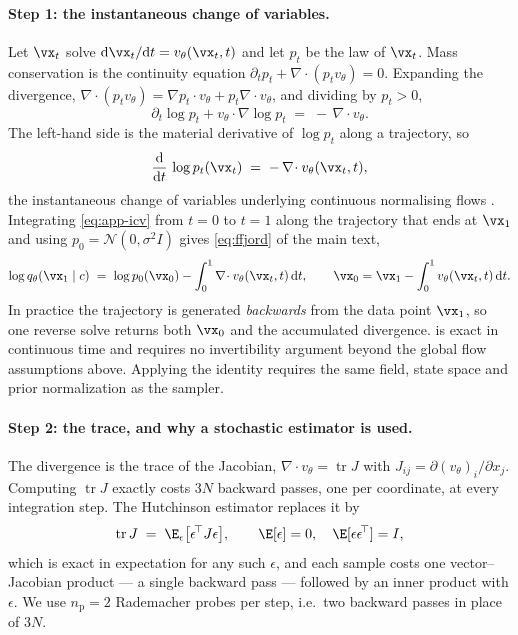 \paragraph{Step 1: the instantaneous change of variables.} Let $\vx_t$ solve
$\mathrm{d}\vx_t/\mathrm{d}t = v_\theta(\vx_t,t)$ and let $p_t$ be the law of
$\vx_t$. Mass conservation is the continuity equation
$\partial_t p_t + \nabla\!\cdot(p_t v_\theta) = 0$. Expanding the divergence,
$\nabla\!\cdot(p_t v_\theta) = \nabla p_t \cdot v_\theta + p_t \nabla\!\cdot v_\theta$,
and dividing by $p_t > 0$,
\begin{equation}
  \partial_t \log p_t + v_\theta \cdot \nabla \log p_t
  \;=\; -\,\nabla\!\cdot v_\theta .
\end{equation}
The left-hand side is the material derivative of $\log p_t$ along a trajectory, so
\begin{equation}
  \frac{\mathrm{d}}{\mathrm{d}t}\,\log p_t(\vx_t)
  \;=\; -\,\nabla\!\cdot v_\theta(\vx_t,t) ,
  \label{eq:app-icv}
\end{equation}
the instantaneous change of variables underlying continuous normalising flows
\citep{ffjord}. Integrating \eqref{eq:app-icv} from $t=0$ to $t=1$ along the
trajectory that ends at $\vx_1$ and using $p_0 = \mathcal{N}(0,\sigma^2 I)$ gives
\eqref{eq:ffjord} of the main text,
\begin{equation}
  \log q_\theta(\vx_1 \mid c)
  \;=\; \log p_0(\vx_0) - \int_0^1 \nabla\!\cdot v_\theta(\vx_t,t)\,\mathrm{d}t ,
  \qquad
  \vx_0 = \vx_1 - \int_0^1 v_\theta(\vx_t,t)\,\mathrm{d}t .
  \label{eq:app-ffjord}
\end{equation}
In practice the trajectory is generated \emph{backwards} from the data point
$\vx_1$, so one reverse solve returns both $\vx_0$ and the accumulated divergence.
 is exact in continuous time and requires no invertibility
argument beyond the global flow assumptions above. Applying the identity requires
the same field, state space and prior normalization as the sampler.

\paragraph{Step 2: the trace, and why a stochastic estimator is used.} The
divergence is the trace of the Jacobian, $\nabla\!\cdot v_\theta = \operatorname{tr} J$
with $J_{ij} = \partial (v_\theta)_i/\partial x_j$. Computing $\operatorname{tr} J$ exactly
costs $3N$ backward passes, one per coordinate, at every integration step. The
Hutchinson estimator \citep{hutchinson} replaces it by
\begin{equation}
  \operatorname{tr} J \;=\; \E_{\epsilon}\bigl[\epsilon^{\!\top} J \epsilon\bigr],
  \qquad \E[\epsilon] = 0,\quad \E[\epsilon\epsilon^{\!\top}] = I ,
  \label{eq:app-hutch}
\end{equation}
which is exact in expectation for any such $\epsilon$, and each sample costs one
vector--Jacobian product --- a single backward pass --- followed by an inner product
with $\epsilon$. We use $n_{\mathrm{p}} = 2$ Rademacher probes per step, i.e.\ two
backward passes in place of $3N$.

